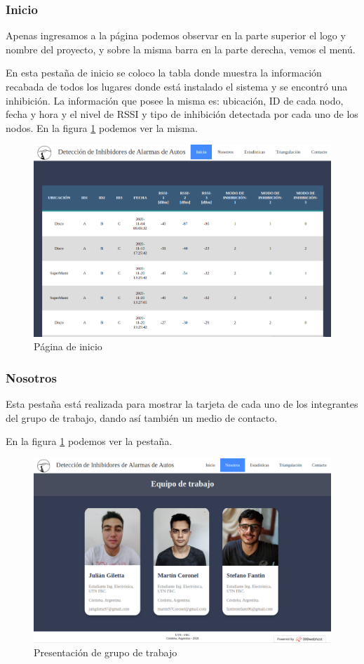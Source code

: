 \subsubsection{Inicio}
Apenas ingresamos a la página podemos observar en la parte superior el logo y nombre del proyecto, y sobre la misma barra en la parte derecha, vemos el menú.
\par En esta pestaña de inicio se coloco la tabla donde muestra la información recabada de todos los lugares donde está instalado el sistema y se encontró 
una inhibición. La información que posee la misma es: ubicación, ID de cada nodo, fecha y hora y el nivel de RSSI y tipo de inhibición detectada por cada uno
 de los nodos. En la figura \ref{web_inicio} podemos ver la misma. 
\begin{figure}[h!]
	\centering
	\includegraphics[scale=0.32]{images/web/tabla-web.png}
    \caption{Página de inicio}
	\label{web_inicio}
\end{figure}
\subsubsection{Nosotros}
Esta pestaña está realizada para mostrar la tarjeta de cada uno de los integrantes del grupo de trabajo, dando así también un medio de contacto.
\par En la figura \ref{web_inicio} podemos ver la pestaña. 
\begin{figure}[h!]
	\centering
	\includegraphics[scale=0.3]{images/web/nosotros-web.png}
    \caption{Presentación de grupo de trabajo}
	\label{web_nos}
\end{figure}
